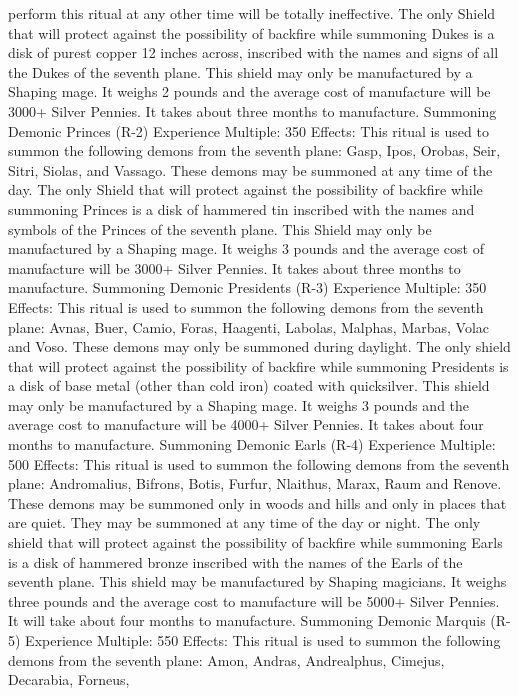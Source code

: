 \documentclass[a4paper]{article}
\begin{document}
\begin{multicols}{3}
perform this ritual at any other time will be totally
ineffective.
The only Shield that will protect against the possibility of backfire while summoning Dukes is a disk
of purest copper
12 inches across, inscribed with the names and
signs of all the Dukes of the seventh plane. This
shield may only be manufactured by a Shaping
mage. It weighs 2 pounds and the average cost of
manufacture will be 3000+ Silver Pennies. It takes
about three months to manufacture.
Summoning Demonic Princes (R-2)
Experience Multiple: 350
Effects: This ritual is used to summon the following demons from the seventh plane: Gasp, Ipos,
Orobas, Seir, Sitri, Siolas, and Vassago. These
demons may be summoned at any time of the day.
The only Shield that will protect against the possibility of backfire while summoning Princes is a
disk of hammered tin inscribed with the names and
symbols of the Princes of the seventh plane. This
Shield may only be manufactured by a Shaping
mage. It weighs 3 pounds and the average cost of
manufacture will be 3000+ Silver Pennies. It takes
about three months to manufacture.
Summoning Demonic Presidents (R-3)
Experience Multiple: 350
Effects: This ritual is used to summon the following demons from the seventh plane: Avnas, Buer,
Camio, Foras, Haagenti, Labolas, Malphas, Marbas, Volac and Voso. These demons may only be
summoned during daylight.
The only shield that will protect against the possibility of backfire while summoning Presidents is a
disk of base metal (other than cold iron) coated
with quicksilver. This shield may only be manufactured by a Shaping mage. It weighs 3 pounds and
the average cost to manufacture will be 4000+
Silver Pennies. It takes about four months to manufacture.
Summoning Demonic Earls (R-4)
Experience Multiple: 500
Effects: This ritual is used to summon the following demons from the seventh plane: Andromalius,
Bifrons, Botis, Furfur, Nlaithus, Marax, Raum and
Renove. These demons may be summoned only in
woods and hills and only in places that are quiet.
They may be summoned at any time of the day or
night.
The only shield that will protect against the possibility of backfire while summoning Earls is a disk
of hammered bronze inscribed with the names of
the Earls of the seventh plane. This shield may be
manufactured by Shaping magicians. It weighs
three pounds and the average cost to manufacture
will be 5000+ Silver Pennies. It will take about
four months to manufacture.
Summoning Demonic Marquis (R-5)
Experience Multiple: 550
Effects: This ritual is used to summon the following demons from the seventh plane: Amon, Andras, Andrealphus, Cimejus, Decarabia, Forneus,


\end{multicols}
\end{document}
